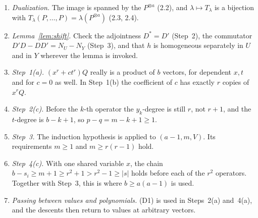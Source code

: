 \documentclass[11pt]{article}
\theoremstyle{remark}
\begin{document}
\begin{enumerate}[leftmargin=2em,itemsep=1pt,topsep=3pt]
\item \emph{Dualization.} The image is spanned by the $P^{\otimes a}$
(2.2), and $\lambda\mapsto T_\lambda$ is a bijection with
$T_\lambda(P,\ldots,P)=\lambda(P^{\otimes a})$ (2.3, 2.4).
\item \emph{Lemma~\ref{lem:shift}.} Check the adjointness $D^*=D'$
(Step~2), the commutator $D'D-DD'=N_U-N_Y$ (Step~3), and that $h$ is
homogeneous separately in $U$ and in $Y$ wherever the lemma is invoked.
\item \emph{Step~1(a).} $(x^r+ct^r)Q$ really is a product of $b$ vectors,
for dependent $x,t$ and for $c=0$ as well. In Step~1(b) the coefficient of
$c$ has exactly $r$ copies of $x^rQ$.
\item \emph{Step~2(c).} Before the $k$-th operator the $y_k$-degree is
still $r$, not $r+1$, and the $t$-degree is $b-k+1$, so $p-q=m-k+1\ge1$.
\item \emph{Step~3.} The induction hypothesis is applied to
$(a-1,m,V)$. Its requirements $m\ge1$ and $m\ge r(r-1)$ hold.
\item \emph{Step~4(c).} With one shared variable $x$, the chain
$b-s_i\ge m+1\ge r^2+1>r^2-1\ge|s|$ holds before each of the $r^2$
operators. Together with Step~3, this is where $b\ge a(a-1)$ is used.
\item \emph{Passing between values and polynomials.} (D1) is used in
Steps~2(a) and~4(a), and the descents then return to values at arbitrary
vectors.
\end{enumerate}
\end{document}
